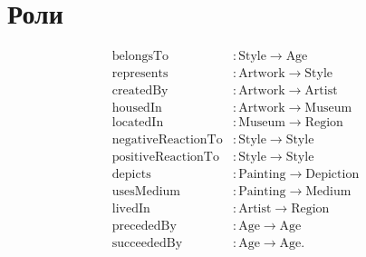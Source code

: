 \documentclass{article}
\begin{document}
\section*{Роли}
\begin{align*}
  \text{belongsTo} &: \text{Style} \to \text{Age}\\
  \text{represents} &: \text{Artwork} \to \text{Style}\\
  \text{createdBy} &: \text{Artwork} \to \text{Artist}\\
  \text{housedIn} &: \text{Artwork} \to \text{Museum}\\
  \text{locatedIn} &: \text{Museum} \to \text{Region}\\
  \text{negativeReactionTo} &: \text{Style} \to \text{Style}\\
  \text{positiveReactionTo} &: \text{Style} \to \text{Style}\\
  \text{depicts} &: \text{Painting} \to \text{Depiction}\\
  \text{usesMedium} &: \text{Painting} \to \text{Medium}\\
  \text{livedIn} &: \text{Artist} \to \text{Region}\\
  \text{precededBy} &: \text{Age} \to \text{Age}\\
  \text{succeededBy} &: \text{Age} \to \text{Age}.
\end{align*}
\end{document}
